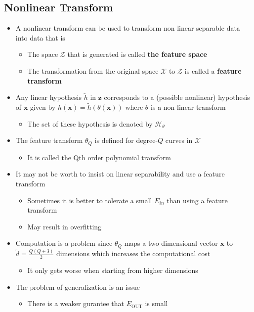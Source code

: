 \documentclass[a4, english]{article}
\begin{document}
\subsection{Nonlinear Transform}
\begin{itemize}
	\item A nonlinear transform can be used to transform non linear separable data into data that is
  \begin{itemize}
  	\item The space $\mathcal Z$ that is generated is called \textbf{the feature space}
    \item The transformation from the original space $\mathcal X$ to $\mathcal Z$ is called a \textbf{feature transform}
  \end{itemize}
    \item Any linear hypothesis $\tilde h$ in $\pmb z$ corresponds to a (possible nonlinear) hypothesis of $\pmb x$ given by $h(\pmb x) = \widetilde{h} (\theta(\pmb x))$ where $\theta$ is a non linear transform
  \begin{itemize}
   	\item The set of these hypothesis is denoted by $\mathcal H_\theta$
  \end{itemize}
  \item The feature transform $\theta_Q$ is defined for degree-$Q$ curves in $\mathcal X$
  \begin{itemize}
  	\item It is called the Qth order polynomial transform
  \end{itemize}
  \item It may not be worth to insist on linear separability and use a feature transform
  \begin{itemize}
  	\item Sometimes it is better to tolerate a small $E_{in}$ than using a feature transform
    \item May result in overfitting
  \end{itemize}
  \item Computation is a problem since $\theta_Q$ maps a two dimensional vector $\pmb x$ to $\tilde d = \frac{Q(Q+3)}2$ dimensions which increases the computational cost
  \begin{itemize}
  	\item It only gets worse when starting from higher dimensions
  \end{itemize}
  \item The problem of generalization is an issue
  \begin{itemize}
  	\item There is a weaker gurantee that $E_{\text{OUT}}$ is small
  \end{itemize}

\end{itemize}
\end{document}
